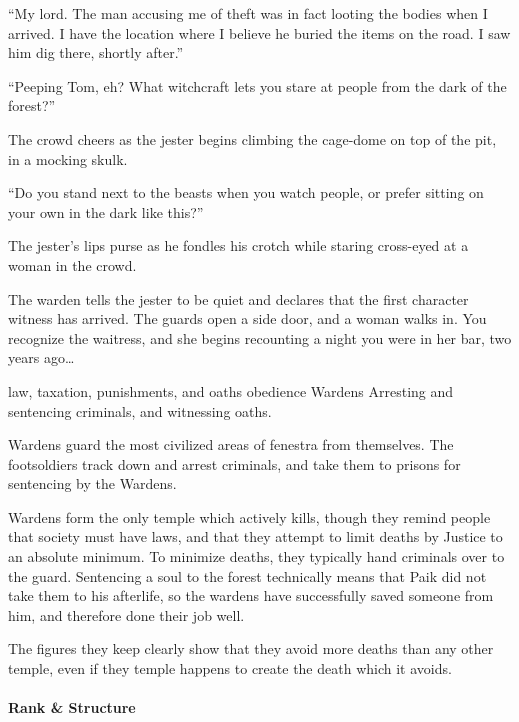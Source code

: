 \begin{multicols}{2}
{    ``My lord.
    The man accusing me of theft was in fact looting the bodies when I arrived.
    I have the location where I believe he buried the items on the road.
    I saw him dig there, shortly after.''

    {\sffamily ``Peeping Tom, eh?
    What witchcraft lets you stare at people from the dark of the forest?''}

    The crowd cheers as the jester begins climbing the cage-dome on top of the pit, in a mocking skulk.

    {\sffamily ``Do you stand next to the beasts when you watch people, or prefer sitting on your own in the dark like this?''}

    The jester's lips purse as he fondles his crotch while staring cross-eyed at a woman in the crowd.

    The warden tells the jester to be quiet and declares that the first character witness has arrived.
    The guards open a side door, and a woman walks in.
    You recognize the waitress, and she begins recounting a night you were in her bar, two years ago\ldots
  }%
  {law, taxation, punishments, and oaths}%
  {obedience}%
  {Wardens}%
  {
    Arresting and sentencing criminals, and witnessing oaths.
  }%

Wardens guard the most civilized areas of \gls{fenestra} from themselves.
The footsoldiers track down and arrest criminals, and take them to prisons for sentencing by the Wardens.

Wardens form the only temple which actively kills, though they remind people that society must have laws, and that they attempt to limit deaths by Justice to an absolute minimum.
To minimize deaths, they typically hand criminals over to the \gls{guard}.
Sentencing a soul to the forest technically means that Paik did not take them to his afterlife, so the wardens have successfully saved someone from him, and therefore done their job well.

The figures they keep clearly show that they avoid more deaths than any other temple, even if they temple happens to create the death which it avoids.

\paragraph{Rank \& Structure}


\end{multicols}
